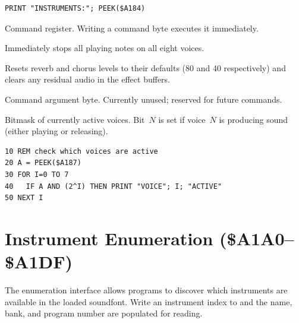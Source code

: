 \begin{lstlisting}
PRINT "INSTRUMENTS:"; PEEK($A184)
\end{lstlisting}



Command register.  Writing a command byte executes it immediately.


Immediately stops all playing notes on all eight voices.


Resets reverb and chorus levels to their defaults (80 and 40 respectively) and
clears any residual audio in the effect buffers.



Command argument byte.  Currently unused; reserved for future commands.



Bitmask of currently active voices.  Bit~$N$ is set if voice~$N$ is producing
sound (either playing or releasing).


\begin{lstlisting}
10 REM check which voices are active
20 A = PEEK($A187)
30 FOR I=0 TO 7
40   IF A AND (2^I) THEN PRINT "VOICE"; I; "ACTIVE"
50 NEXT I
\end{lstlisting}


\section{Instrument Enumeration (\$A1A0--\$A1DF)}
\label{sec:wts-enum}

The enumeration interface allows programs to discover which instruments are
available in the loaded soundfont.  Write an instrument index to 
and the name, bank, and program number are populated for reading.

